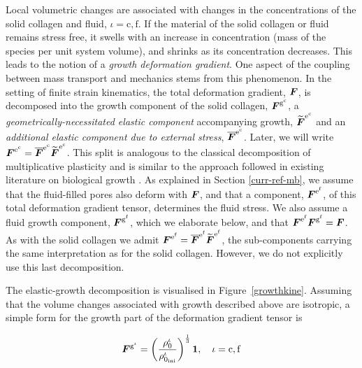 Local volumetric changes are associated with changes in the
concentrations of the solid collagen and fluid, $\iota =
     \mathrm{c,f}$. If the material of the solid collagen or fluid remains
stress free, it swells with an
increase in concentration (mass of the species per unit system
volume), and shrinks as its concentration decreases. This leads to the
notion of a \emph{growth deformation gradient}. One aspect of the
coupling between mass transport and mechanics stems from this
phenomenon. In the setting of finite strain kinematics, the total
deformation gradient, $\mbox{\boldmath$ F$}$, is decomposed into the growth component
of the solid collagen, $\mbox{\boldmath$ F$}^{\mathrm{g}^\mathrm{c}}$, a
\emph{geometrically-necessitated elastic component} 
accompanying growth, $\widetilde{\mbox{\boldmath$ F$}}^{\mathrm{e}^\mathrm{c}}$ and an \emph{additional elastic component due
to external stress}, $\overline{\mbox{\boldmath$ F$}}^{\mathrm{e}^\mathrm{c}}$. Later,
we will write $\mbox{\boldmath$ F$}^{\mathrm{e}^\mathrm{c}} =
\overline{\mbox{\boldmath$ F$}}^{\mathrm{e}^\mathrm{c}}\widetilde{\mbox{\boldmath$ F$}}^{\mathrm{e}^\mathrm{c}}$.
This split is analogous to the classical
decomposition of multiplicative plasticity \citep{Lee:1969} and is
similar to the approach followed in existing literature on biological
growth \citep[see for
  e.g.][]{Klischetal:2001,TaberHumphrey:2001,AmbrosiMollica:2002}. As
explained in Section \ref{curr-ref-mb}, we assume that the
fluid-filled pores also deform with $\mbox{\boldmath$ F$}$, and that a component,
$\mbox{\boldmath$ F$}^{\mathrm{e}^\mathrm{f}}$, of this total deformation gradient
tensor, determines the fluid stress. We also assume a fluid growth
component, $\mbox{\boldmath$ F$}^{\mathrm{g}^\mathrm{f}}$, which we elaborate below,
and that $\mbox{\boldmath$ F$}^{\mathrm{e}^\mathrm{f}}\mbox{\boldmath$ F$}^{\mathrm{g}^\mathrm{f}} =
\mbox{\boldmath$ F$}$. As with the solid collagen we admit $\mbox{\boldmath$ F$}^{\mathrm{e}^\mathrm{f}}
=
\overline{\mbox{\boldmath$ F$}}^{\mathrm{e}^\mathrm{f}}\widetilde{\mbox{\boldmath$ F$}}^{\mathrm{e}^\mathrm{f}}$,
the sub-components carrying the same interpretation as for the solid
collagen. However, we do not explicitly use this last decomposition.

The elastic-growth decomposition is visualised in \mbox{Figure~\ref{growthkine}}.
Assuming that the volume changes associated with growth described
above are isotropic, a simple form for the growth part of the
deformation gradient tensor is

\begin{equation}
\mbox{\boldmath$ F$}^{\mathrm{g}^\iota} = \left(
  \frac{\rho_0^\iota}{\rho_{0_{\mathrm{ini}}}^\iota} \right)^
  {\frac{1}{3}} 
{\bf 1},\quad \iota = \mathrm{c,f}
\label{isotropicgrowth} 
\end{equation} 

